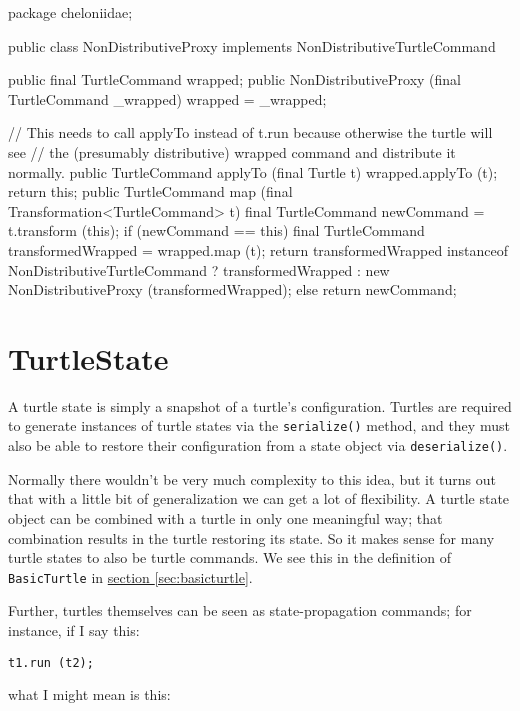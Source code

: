 \documentclass{report}
\newcommand{\Ref}[2]{\hyperref[#2]{#1 \ref*{#2}}}
\begin{document}
\begin{javacode}
package cheloniidae;

public class NonDistributiveProxy implements NonDistributiveTurtleCommand {
  public final TurtleCommand wrapped;
  public NonDistributiveProxy (final TurtleCommand _wrapped) {wrapped = _wrapped;}

  // This needs to call applyTo instead of t.run because otherwise the turtle will see
  // the (presumably distributive) wrapped command and distribute it normally.
  public TurtleCommand applyTo (final Turtle t) {wrapped.applyTo (t); return this;}
  public TurtleCommand map (final Transformation<TurtleCommand> t) {
    final TurtleCommand newCommand = t.transform (this);
    if (newCommand == this) {
      final TurtleCommand transformedWrapped = wrapped.map (t);
      return transformedWrapped instanceof NonDistributiveTurtleCommand ? transformedWrapped :
                                                                          new NonDistributiveProxy (transformedWrapped);
    } else return newCommand;
  }
}
\end{javacode}

\section {TurtleState} \label{sec:turtlestate}
      A turtle state is simply a snapshot of a turtle's configuration. Turtles are required to generate instances of turtle states via the {\tt serialize()}
      method, and they must also be able to restore their configuration from a state object via {\tt deserialize()}.

      Normally there wouldn't be very much complexity to this idea, but it turns out that with a little bit of generalization we can get a lot of flexibility. A
      turtle state object can be combined with a turtle in only one meaningful way; that combination results in the turtle restoring its state. So it makes
      sense for many turtle states to also be turtle commands. We see this in the definition of {\tt BasicTurtle} in \Ref{section}{sec:basicturtle}.

      Further, turtles themselves can be seen as state-propagation commands; for instance, if I say this:

\begin{verbatim}
t1.run (t2);
\end{verbatim}

      \noindent what I might mean is this:
\end{document}
